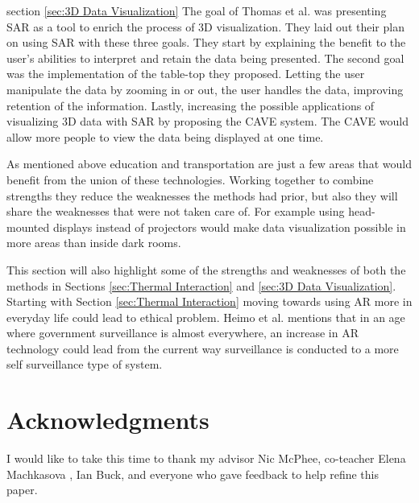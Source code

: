 \documentclass{sig-alternate}
\begin{document}
section \ref{sec:3D Data Visualization} The goal of Thomas et al. \cite{3D} was presenting SAR as a tool to enrich the process of 3D visualization. They laid out their plan on using SAR with these three goals. They start by explaining the benefit to the user's abilities to interpret and retain the data being presented. The second goal was the implementation of the table-top they proposed. Letting the user manipulate the data by zooming in or out, the user handles the data, improving retention of the information. Lastly, increasing the possible applications of visualizing 3D data with SAR by proposing the CAVE system. The CAVE would allow more people to view the data being displayed at one time.

As mentioned above education and transportation are just a few areas that would benefit from the union of these technologies. Working together to combine strengths they reduce the weaknesses the methods had prior, but also they will share the weaknesses that were not taken care of. For example using head-mounted displays instead of projectors would make data visualization possible in more areas than inside dark rooms.

This section will also highlight some of the strengths and weaknesses of both the methods in Sections \ref{sec:Thermal Interaction} and \ref{sec:3D Data Visualization}. Starting with Section \ref{sec:Thermal Interaction} moving towards using AR more in everyday life could lead to ethical problem. Heimo et al. \cite{ethics} mentions that in an age where government surveillance is almost everywhere, an increase in AR technology could lead from the current way surveillance is conducted to a more self surveillance type of system.



\section{Acknowledgments}
\label{sec:Acknowledgments}
I would like to take this time to thank my advisor Nic McPhee, co-teacher Elena Machkasova    , Ian Buck, and everyone who gave feedback to help refine this paper. 


\end{document}
